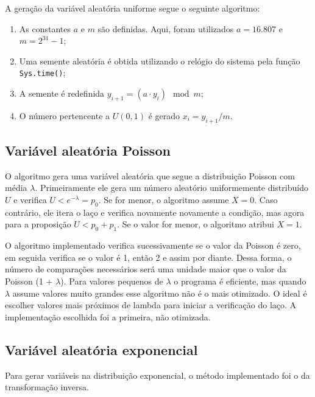 \documentclass[
]{article}
\providecommand{\tightlist}{%
  \setlength{\itemsep}{0pt}\setlength{\parskip}{0pt}}
\begin{document}
A geração da variável aleatória uniforme segue o seguinte algoritmo:

\begin{enumerate}
\def\labelenumi{\arabic{enumi}.}
\tightlist
\item
  As constantes \(a\) e \(m\) são definidas. Aqui, foram utilizados
  \(a = 16.807\) e \(m = 2^{31}-1\);
\item
  Uma semente aleatória é obtida utilizando o relógio do sistema pela
  função \texttt{Sys.time()};
\item
  A semente é redefinida \(y_{i+1} = (a \cdot y_i) \mod m\);
\item
  O número pertencente a \(U(0,1)\) é gerado \(x_i = y_{i+1}/m\).
\end{enumerate}

\hypertarget{variuxe1vel-aleatuxf3ria-poisson}{%
\subsection{Variável aleatória
Poisson}\label{variuxe1vel-aleatuxf3ria-poisson}}

O algoritmo gera uma variável aleatória que segue a distribuição Poisson
com média \(\lambda\). Primeiramente ele gera um número aleatório
uniformemente distribuído \(U\) e verifica \(U < e^{-\lambda} = p_0\).
Se for menor, o algoritmo assume \(X = 0\). Caso contrário, ele itera o
laço e verifica novamente novamente a condição, mas agora para a
proposição \(U < p_0 + p_1\). Se o valor for menor, o algoritmo atribui
\(X = 1\).

O algoritmo implementado verifica sucessivamente se o valor da Poisson é
zero, em seguida verifica se o valor é 1, então 2 e assim por diante.
Dessa forma, o número de comparações necessários será uma unidade maior
que o valor da Poisson (1 + \(\lambda\)). Para valores pequenos de
\(\lambda\) o programa é eficiente, mas quando \(\lambda\) assume
valores muito grandes esse algoritmo não é o mais otimizado. O ideal é
escolher valores mais próximos de lambda para iniciar a verificação do
laço. A implementação escolhida foi a primeira, não otimizada.

\hypertarget{variuxe1vel-aleatuxf3ria-exponencial}{%
\subsection{Variável aleatória
exponencial}\label{variuxe1vel-aleatuxf3ria-exponencial}}

Para gerar variáveis na distribuição exponencial, o método implementado
foi o da transformação inversa.
\end{document}
